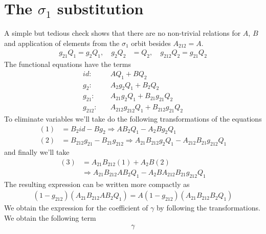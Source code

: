 \section{The $\sigma_1$ substitution}
A simple but tedious check shows that there are no non-trivial relations for $A$, $B$ and application of elements from the $\sigma_1$ orbit besides $A_{212} = A$.
\begin{align}
	g_{21}Q_1 = g_2 Q_1,\quad g_2 Q_2 &= Q_2,\quad g_{212} Q_2= g_{21} Q_2
\end{align}
The functional equations have the terms
\begin{align}
	id:&\quad AQ_1+BQ_2 \\
	g_2:&\quad A_2 g_2Q_1 + B_2 Q_2\\
	g_{21}:&\quad A_{21}g_2Q_1 + B_{21}g_{21}Q_2 \\
	g_{212}:&\quad A_{212} g_{212}Q_1 + B_{212} g_{21}Q_2
\end{align}
To eliminate variables we'll take do the following transformations of the equations
\begin{align}
	(1) &= B_2 id - B g_2 \Longrightarrow AB_2 Q_1 - A_2 B g_2 Q_1\\
	(2) &= B_{212} g_{21} - B_{21} g_{212} \Longrightarrow A_{21}B_{212} g_2 Q_1 - A_{212} B_{21} g_{212} Q_1
\end{align}
and finally we'll take
\begin{align}
	(3) &= A_{21}B_{212}(1) + A_2 B (2)\\
	&\Longrightarrow A_{21}B_{212}A B_2 Q_1 - A_2 B A_{212} B_{21} g_{212} Q_1
\end{align}
The resulting expression can be written more compactly as
\begin{align}
(1-g_{212})(A_{21}B_{212}A B_2 Q_1)  = A (1-g_{212})(A_{21}B_{212} B_2 Q_1)
\end{align}
We obtain the expression for the coefficient of $\gamma$ by following the transformations. We obtain the following term
\begin{align}
	[A_{21}B_{212}(B_2 - B)+A_2 B(B_{212} - B_{21})]\gamma
\end{align}

